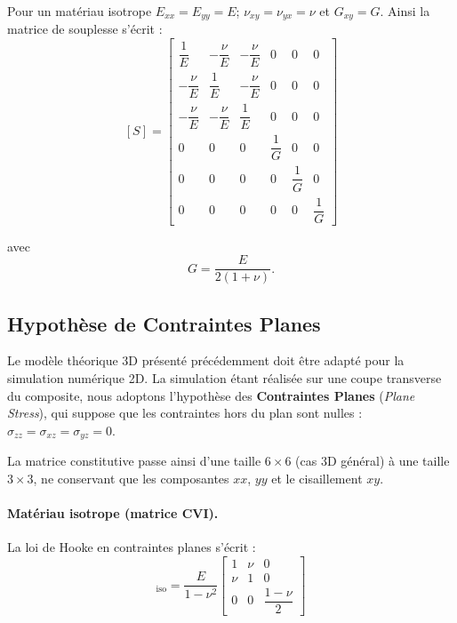 \documentclass[a4paper,11pt]{article}
\begin{document}
Pour un matériau isotrope $E_{xx} = E_{yy} = E$; $\nu_{xy} = \nu_{yx} = \nu$ et $G_{xy} = G$. Ainsi la matrice de souplesse s'écrit :
\begin{equation}
{[S]} =
\begin{bmatrix}
\dfrac{1}{E} & -\dfrac{\nu}{E} & -\dfrac{\nu}{E} & 0 & 0 & 0 \\
-\dfrac{\nu}{E} & \dfrac{1}{E} & -\dfrac{\nu}{E} & 0 & 0 & 0 \\
-\dfrac{\nu}{E} & -\dfrac{\nu}{E} & \dfrac{1}{E} & 0 & 0 & 0 \\
0 & 0 & 0 & \dfrac{1}{G} & 0 & 0 \\
0 & 0 & 0 & 0 & \dfrac{1}{G} & 0 \\
0 & 0 & 0 & 0 & 0 & \dfrac{1}{G}
\end{bmatrix}
\end{equation}

avec
\[
G = \dfrac{E}{2(1+\nu)}.
\]

\subsection{Hypothèse de Contraintes Planes}

Le modèle théorique 3D présenté précédemment doit être adapté pour la simulation numérique 2D. La simulation étant réalisée sur une coupe transverse du composite, nous adoptons l'hypothèse des \textbf{Contraintes Planes} (\textit{Plane Stress}), qui suppose que les contraintes hors du plan sont nulles : $\sigma_{zz} = \sigma_{xz} = \sigma_{yz} = 0$.

La matrice constitutive passe ainsi d'une taille $6 \times 6$ (cas 3D général) à une taille $3 \times 3$, ne conservant que les composantes $xx$, $yy$ et le cisaillement $xy$.

\paragraph{Matériau isotrope (matrice CVI).} La loi de Hooke en contraintes planes s'écrit :
\begin{equation}
    [\mathbf{C}]_{\mathrm{iso}} =
    \frac{E}{1-\nu^2}
    \begin{bmatrix}
    1 & \nu & 0 \\
    \nu & 1 & 0 \\
    0 & 0 & \dfrac{1-\nu}{2}
    \end{bmatrix}
    \label{eq:rigidite_isotrope_plane}
\end{equation}
\end{document}
